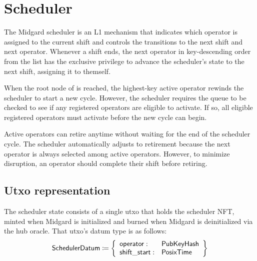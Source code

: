 \documentclass[../midgard.tex]{subfiles}
\begin{document}
\section{Scheduler}
\label{h:scheduler}

The Midgard scheduler is an L1 mechanism that indicates which operator is assigned to the current shift and controls the transitions to the next shift and next operator.
Whenever a shift ends, the next operator in key-descending order from the  list has the exclusive privilege to advance the scheduler's state to the next shift, assigning it to themself.

When the root node of  is reached, the highest-key active operator rewinds the scheduler to start a new cycle.
However, the scheduler requires the  queue to be checked to see if any registered operators are eligible to activate.
If so, all eligible registered operators must activate before the new cycle can begin.

Active operators can retire anytime without waiting for the end of the scheduler cycle.
The scheduler automatically adjusts to retirement because the next operator is always selected among active operators.
However, to minimize disruption, an operator should complete their shift before retiring.

\todo

\subsection{Utxo representation}
\label{h:scheduler-utxo-representation}

The scheduler state consists of a single utxo that holds the scheduler NFT, minted when Midgard is initialized and burned when Midgard is deinitialized via the hub oracle.
That utxo's datum type is as follows:
\begin{equation*}
    \mathsf{SchedulerDatum} \coloneq \left\{
    \begin{array}{ll}
        \mathsf{operator}  : & \mathsf{PubKeyHash} \\
        \mathsf{shift\_start} : & \mathsf{PosixTime}
    \end{array} \right\}
\end{equation*}
\end{document}
